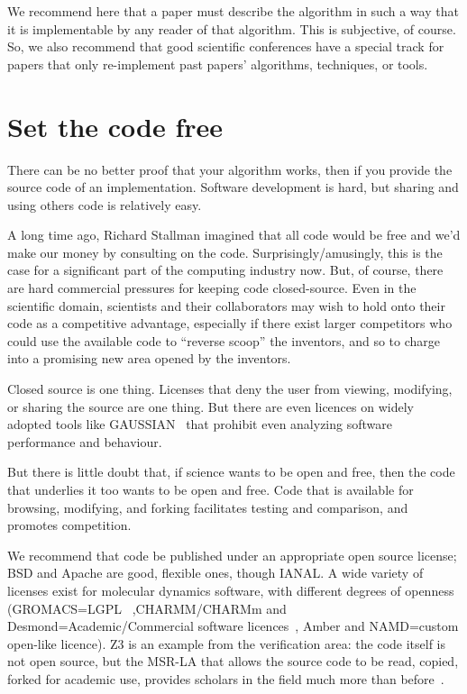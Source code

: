 \documentclass[conference]{IEEEtran}
\begin{document}
We recommend here that a paper must describe the algorithm in such a
way that it is implementable by any reader of that algorithm. This is
subjective, of course. So, we also recommend that good scientific
conferences have a special track for papers that only re-implement
past papers' algorithms, techniques, or tools.


\section{Set the code free} 

There can be no better proof that your algorithm works, then if you
provide the source code of an implementation. Software development is
hard, but sharing and using others code is relatively easy.

A long time ago, Richard Stallman imagined that all code would be free
and we'd make our money by consulting on the code.
Surprisingly/amusingly, this is the case for a significant part of the
computing industry now. But, of course, there are hard commercial
pressures for keeping code closed-source. Even in the scientific
domain, scientists and their collaborators may wish to hold onto their
code as a competitive advantage, especially if there exist larger
competitors who could use the available code to ``reverse scoop'' the
inventors, and so to charge into a promising new area opened by the
inventors.

Closed source is one thing. Licenses that deny the user from viewing,
modifying, or sharing the source are one thing. But there are even
licences on widely adopted tools like GAUSSIAN~\cite{Giles2004} that
prohibit even analyzing software performance and behaviour.
 
But there is little doubt that, if science wants to be open and free,
then the code that underlies it too wants to be open and free. Code
that is available for browsing, modifying, and forking facilitates
testing and comparison, and promotes competition.

We recommend that code be published under an appropriate open source
license; BSD and Apache are good, flexible ones, though IANAL.  A wide
variety of licenses exist for molecular dynamics software, with
different degrees of openness (GROMACS=LGPL~\cite{Hess2008}
,CHARMM/CHARMm and Desmond=Academic/Commercial software
licences~\cite{Brooks2009,Bowers2006}, Amber and NAMD=custom open-like
licence). Z3 is an example from the verification area: the code itself
is not open source, but the MSR-LA that allows the source code to be
read, copied, forked for academic use, provides scholars in the field
much more than before~\cite{deMoura2012Z3open}.
\end{document}
